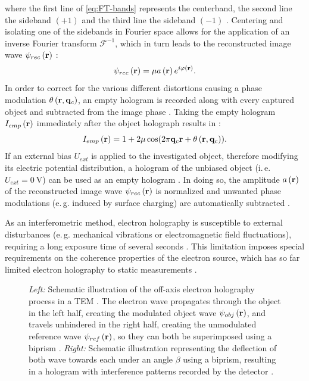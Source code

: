 where the first line of \cref{eq:FT-bands} represents the centerband, the second line the sideband $\left(+1\right)$ and the third line the sideband $\left(-1\right)$ \cite{Lehmann1994,Voelkl1995}. Centering and isolating one of the sidebands in Fourier space allows for the application of an inverse Fourier transform $\mathcal{F}^{-1}$, which in turn leads to the reconstructed image wave ${\psi}_{rec}\left(\vb{r}\right)$ \cite{Lehmann1994,Voelkl1995}:
\begin{equation}
	{\psi}_{rec}\left(\vb{r}\right) = \mu a\left(\vb{r}\right)e^{i\varphi\left(\vb{r}\right)}.
\end{equation}
In order to correct for the various different distortions causing a phase modulation $\theta\left(\vb{r},\vb{q}_c\right)$, an empty hologram is recorded along with every captured object and subtracted from the image phase \cite{voelkl1999,Lichte2007}. Taking the empty hologram $I_{emp}\left(\vb{r}\right)$ immediately after the object holograph results in \cite{voelkl1999}:
\begin{equation}
	I_{emp}\left(\vb{r}\right) = 1 + 2\mu \cos(2\pi \vb{q}_c \vb{r} + \theta\left(\vb{r}, \vb{q}_c\right)).
\end{equation}
If an external bias $U_{ext}$ is applied to the investigated object, therefore modifying its electric potential distribution, a hologram of the unbiased object (i.\,e. $U_{ext} = \SI{0}{\volt}$) can be used as an empty hologram \cite{Niermann2017,Wagner2019}. In doing so, the amplitude $a\left(\vb{r}\right)$ of the reconstructed image wave ${\psi}_{rec}\left(\vb{r}\right)$ is normalized and unwanted phase modulations (e.\,g. induced by surface charging) are automatically subtracted \cite{Wagner2019}.

As an interferometric method, electron holography is susceptible to external disturbances (e.\,g. mechanical vibrations or electromagnetic field fluctuations), requiring a long exposure time of several seconds \cite{Niermann2017}. This limitation imposes special requirements on the coherence properties of the electron source, which has so far limited electron holography to static measurements \cite{Niermann2017}.%
\begin{figure}[H]
	\centering
	\caption{\emph{Left:} Schematic illustration of the off-axis electron holography process in a TEM \cite{Lehmann2002,Lichte2007}. The electron wave propagates through the object in the left half, creating the modulated object wave ${\psi}_{obj}\left(\vb{r}\right)$, and travels unhindered in the right half, creating the unmodulated reference wave ${\psi}_{ref}\left(\vb{r}\right)$, so they can both be superimposed using a biprism \cite{Lehmann2002,Lichte2007}. \emph{Right:} Schematic illustration representing the deflection of both wave towards each under an angle $\beta$ using a biprism, resulting in a hologram with interference patterns recorded by the detector \cite{Lehmann2002,Lichte2007}.}
	\label{fig:EH-setup}
\end{figure}
\newpage
